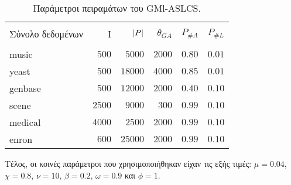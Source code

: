 \begin{table}[!h]
\begin{center}
    \caption{Παράμετροι πειραμάτων του GMl-ASLCS.}
	\label{table:realDatasetsParams}
    \begin{tabular}{l|rrrll}

	\hline \\ [-2ex]
    Σύνολο δεδομένων	      & I      & $\lvert P\rvert$ & $\theta_{GA}$ & $P_{\#A}$ & $P_{\#L}$ \\
    \hline \\ [-2ex]
    music   & $500$  & $5000$    & $2000$        & $0.80$    & $0.01$    \\
    yeast   & $500$  & $18000$   & $4000$        & $0.85$    & $0.01$    \\
    genbase & $500$  & $12000$   & $2000$        & $0.40$    & $0.10$     \\
    scene   & $2500$ & $9000$    & $300$         & $0.99$    & $0.10$     \\
    medical & $4000$ & $2500$    & $2000$        & $0.99$    & $0.10$     \\
    enron   & $600$  & $25000$   & $2000$        & $0.99$    & $0.10$     \\
    \hline 
    \end{tabular}
    \end{center}
\end{table}

Τέλος, οι κοινές παράμετροι που χρησιμοποιήθηκαν είχαν τις εξής τιμές: $\mu=0.04$, $\chi = 0.8$, $\nu=10$, $\beta = 0.2$, $\omega=0.9$ και $\phi=1$. 








